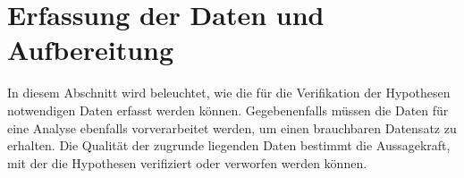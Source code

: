 \section{Erfassung der Daten und Aufbereitung}
\label{sec:erfassung}
In diesem Abschnitt wird beleuchtet, wie die für die Verifikation der Hypothesen notwendigen Daten erfasst werden können.
Gegebenenfalls müssen die Daten für eine Analyse ebenfalls vorverarbeitet werden, um einen brauchbaren Datensatz zu erhalten.
Die Qualität der zugrunde liegenden Daten bestimmt die Aussagekraft, mit der die Hypothesen verifiziert oder verworfen werden können.

